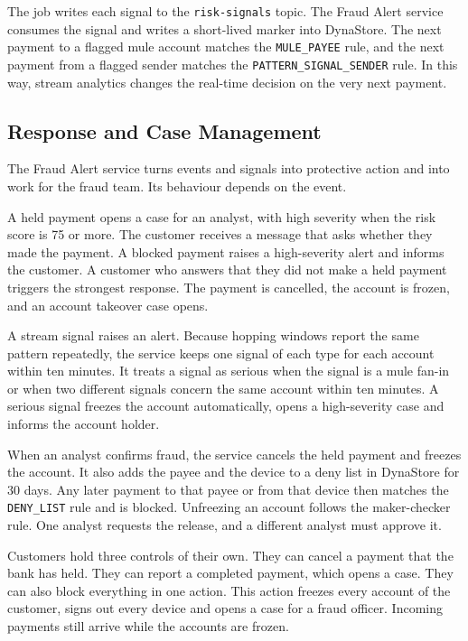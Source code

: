 \documentclass[11pt,a4paper]{article}
\newcommand{\code}[1]{\texttt{#1}}
\begin{document}
The job writes each signal to the \code{risk-signals} topic. The Fraud Alert service consumes the signal and writes a short-lived marker into DynaStore. The next payment to a flagged mule account matches the \code{MULE\_PAYEE} rule, and the next payment from a flagged sender matches the \code{PATTERN\_SIGNAL\_SENDER} rule. In this way, stream analytics changes the real-time decision on the very next payment.

\subsection{Response and Case Management}
\label{sec:response}

The Fraud Alert service turns events and signals into protective action and into work for the fraud team. Its behaviour depends on the event.

A held payment opens a case for an analyst, with high severity when the risk score is 75 or more. The customer receives a message that asks whether they made the payment. A blocked payment raises a high-severity alert and informs the customer. A customer who answers that they did not make a held payment triggers the strongest response. The payment is cancelled, the account is frozen, and an account takeover case opens.

A stream signal raises an alert. Because hopping windows report the same pattern repeatedly, the service keeps one signal of each type for each account within ten minutes. It treats a signal as serious when the signal is a mule fan-in or when two different signals concern the same account within ten minutes. A serious signal freezes the account automatically, opens a high-severity case and informs the account holder.

When an analyst confirms fraud, the service cancels the held payment and freezes the account. It also adds the payee and the device to a deny list in DynaStore for 30 days. Any later payment to that payee or from that device then matches the \code{DENY\_LIST} rule and is blocked. Unfreezing an account follows the maker-checker rule. One analyst requests the release, and a different analyst must approve it.

Customers hold three controls of their own. They can cancel a payment that the bank has held. They can report a completed payment, which opens a case. They can also block everything in one action. This action freezes every account of the customer, signs out every device and opens a case for a fraud officer. Incoming payments still arrive while the accounts are frozen.
\end{document}
